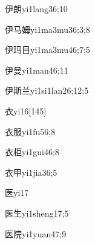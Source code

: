 \begin{verbete}{伊朗}{yi1lang3}{6;10}
\end{verbete}

\begin{verbete}{伊马姆}{yi1ma3mu3}{6;3;8}
\end{verbete}

\begin{verbete}{伊玛目}{yi1ma3mu4}{6;7;5}
\end{verbete}

\begin{verbete}{伊曼}{yi1man4}{6;11}
\end{verbete}

\begin{verbete}{伊斯兰}{yi1si1lan2}{6;12;5}
\end{verbete}

\begin{verbete}{衣}{yi1}{6}[145]
\end{verbete}

\begin{verbete}{衣服}{yi1fu5}{6;8}
\end{verbete}

\begin{verbete}{衣柜}{yi1gui4}{6;8}
\end{verbete}

\begin{verbete}{衣甲}{yi1jia3}{6;5}
\end{verbete}

\begin{verbete}{医}{yi1}{7}
\end{verbete}

\begin{verbete}{医生}{yi1sheng1}{7;5}
\end{verbete}

\begin{verbete}{医院}{yi1yuan4}{7;9}
\end{verbete}

